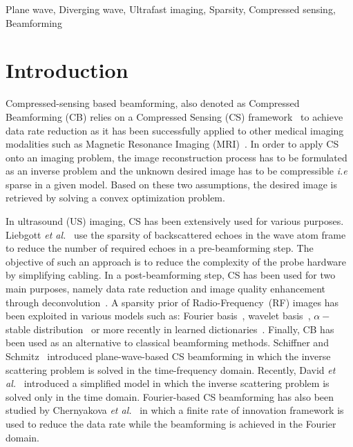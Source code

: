 \documentclass[conference]{IEEEtran}
\newcommand{\etal}{\textit{et al.}}
\begin{document}
\begin{IEEEkeywords}
Plane wave, Diverging wave, Ultrafast imaging, Sparsity, Compressed sensing, Beamforming
\end{IEEEkeywords}

\IEEEpeerreviewmaketitle

\section{Introduction}
\par Compressed-sensing based beamforming, also denoted as Compressed Beamforming (CB) relies on a Compressed Sensing (CS) framework~\cite{Candes_SPM_2008} to achieve data rate reduction as it has been successfully applied to other medical imaging modalities such as Magnetic Resonance Imaging (MRI)~\cite{Lutsig_MRM_2007}. In order to apply CS onto an imaging problem, the image reconstruction process has to be formulated as an inverse problem and the unknown desired image has to be compressible \textit{i.e} sparse in a given model. Based on these two assumptions, the desired image is retrieved by solving a convex optimization problem. 
\par In ultrasound (US) imaging, CS has been extensively used for various purposes. Liebgott \etal{}~\cite{Liebgott_Ult_2013} use the sparsity of backscattered echoes in the wave atom frame to reduce the number of required echoes in a pre-beamforming step.  The objective of such an approach is to reduce the complexity of the probe hardware by simplifying cabling. In a post-beamforming step, CS has been used for two main purposes, namely data rate reduction and image quality enhancement through deconvolution~\cite{Chen2015}. A sparsity prior of Radio-Frequency~(RF) images has been exploited in various models such as: Fourier basis~\cite{Quinsac2012}, wavelet basis~\cite{Quinsac2012}, $\alpha-$stable distribution~\cite{Dobigeon2012} or more recently in learned dictionaries~\cite{Lorintiu_TMI_2015}. Finally, CB has been used as an alternative to classical beamforming methods. Schiffner and Schmitz~\cite{Schiffner_IUS_2012} introduced plane-wave-based CS beamforming in which the inverse scattering problem is solved in the time-frequency domain. Recently, David \etal{}~\cite{David_JASA_2015} introduced a simplified model in which the inverse scattering problem is solved only in the time domain. Fourier-based CS beamforming has also been studied by Chernyakova \etal{}~\cite{Chernyakova2014} in which a finite rate of innovation framework is used to reduce the data rate while the beamforming is achieved in the Fourier domain.
\end{document}
